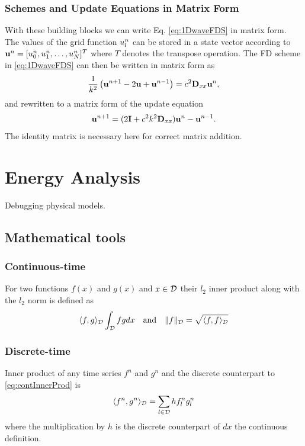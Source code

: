 \subsubsection{Schemes and Update Equations in Matrix Form}
With these building blocks we can write Eq. \eqref{eq:1DwaveFDS} in matrix form. The values of the grid function $u_l^n$ can be stored in a state vector according to $\mathbf{u}^n = [u_0^n, u_1^n, \hdots, u_N^n]^T$ where $T$ denotes the transpose operation. The FD scheme in \eqref{eq:1DwaveFDS} can then be written in matrix form as
\begin{equation}\label{eq:1DwaveMatrix}
    \frac{1}{k^2}\left(\mathbf{u}^{n+1} - 2 \mathbf{u} + \mathbf{u}^{n-1}\right) = c^2 \mathbf{D}_{xx} \mathbf{u}^n,
\end{equation}
and rewritten to a matrix form of the update equation
\begin{equation}
    \mathbf{u}^{n+1} = (2\mathbf{I} + c^2k^2 \mathbf{D}_{xx} )\mathbf{u}^n - \mathbf{u}^{n-1}.
\end{equation}
The identity matrix is necessary here for correct matrix addition.

\section{Energy Analysis}\label{sec:energyAnalysis}
Debugging physical models.

\subsection{Mathematical tools}
\subsubsection{Continuous-time}
For two functions $f(x)$ and $g(x)$ and $x\in\mathcal{D}$ their $l_2$ inner product along with the $l_2$ norm is defined as
\begin{equation}\label{eq:contInnerProd}
    \langle f, g\rangle_{\mathcal{D}} \int_{\mathcal{D}} fg dx \quad \text{and} \quad \lVert f \rVert_{\mathcal{D}} = \sqrt{\langle f, f \rangle_{\mathcal{D}}}
\end{equation}


\subsubsection{Discrete-time}
Inner product of any time series $f^n$ and $g^n$ and the discrete counterpart to \eqref{eq:contInnerProd} is
\begin{equation}\label{eq:discInnerProd}
    \langle f^n, g^n \rangle_{\mathcal{D}} = \sum_{l\in\mathcal{D}} h f_l^n g_l^n
\end{equation}
where the multiplication by $h$ is the discrete counterpart of $dx$ the continuous definition. 


